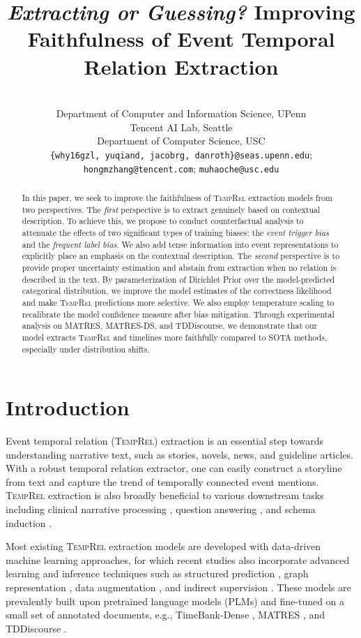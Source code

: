 \documentclass[11pt]{article}
\title{\emph{Extracting or Guessing?} Improving Faithfulness of Event Temporal Relation Extraction}
\author{\makecell{Haoyu Wang, Hongming Zhang, Yuqian Deng, \\Jacob R. Gardner,   Dan Roth \& Muhao Chen}\\
Department of Computer and Information Science, UPenn\\
Tencent AI Lab, Seattle\\
Department of Computer Science, USC\\
\texttt{\{why16gzl, yuqiand, jacobrg, danroth\}@seas.upenn.edu};\\ \texttt{hongmzhang@tencent.com};
\texttt{muhaoche@usc.edu}\\
}
\newcommand{\temprel}{\textsc{TempRel}\xspace}
\begin{document}
\maketitle
\begin{abstract}
In this paper, we seek to improve the faithfulness of \temprel extraction models from two perspectives.
The \textit{first} perspective is to extract genuinely based on contextual description. 
To achieve this, we propose to conduct counterfactual analysis to attenuate the effects of two significant types of training biases: the \textit{event trigger bias} and the \textit{frequent label bias}.
We also add tense information into event  representations to explicitly place an emphasis on the contextual description.
The \textit{second} perspective is to provide proper uncertainty estimation and abstain from extraction when no relation is described in the text.
By parameterization of Dirichlet Prior over the model-predicted categorical distribution, we improve the model estimates of the correctness likelihood and make \temprel predictions more selective.
We also employ temperature scaling to recalibrate the model confidence measure after bias mitigation.
Through experimental analysis on MATRES, MATRES-DS, and TDDiscourse, we demonstrate that our model extracts \temprel and timelines more faithfully compared to SOTA methods, especially under distribution shifts.
\end{abstract}

\section{Introduction}
\label{sec:intro}
Event temporal relation (\temprel) extraction is an essential step towards understanding narrative text, such as stories, novels, news, and guideline articles. 
With a robust temporal relation extractor, one can easily construct a storyline from text and capture the trend of temporally connected event mentions. 
\temprel extraction is also broadly beneficial to various downstream tasks including clinical narrative processing \cite{jindal-roth-2013-using, bethard-etal-2016-semeval}, question answering \cite{llorens-etal-2015-semeval, meng-etal-2017-temporal, stricker-2021-question-answering}, and schema induction \cite{chambers-jurafsky-2009-unsupervised, wen-etal-2021-resin, li-etal-2021-future}.

Most existing \temprel extraction models are developed with data-driven machine learning approaches, for which recent studies also incorporate advanced learning and inference techniques such as structured prediction \cite{ning-etal-2017-structured,ning-etal-2018-improving,han-etal-2019-joint,wang-etal-2020-joint,tan-etal-2021-extracting}, graph representation \cite{mathur-etal-2021-timers, qiang-naacl-2022}, data augmentation \cite{ballesteros-etal-2020-severing,trong2022selecting}, and indirect supervision \cite{zhao-etal-2021-effective, zhou-etal-2021-temporal}.
These models are prevalently built upon pretrained language models (PLMs) and fine-tuned on a small set of annotated documents, e.g., TimeBank-Dense \cite{cassidy-etal-2014-annotation}, MATRES \cite{ning-etal-2018-multi}, and TDDiscourse \cite{naik-etal-2019-tddiscourse}.
\end{document}
